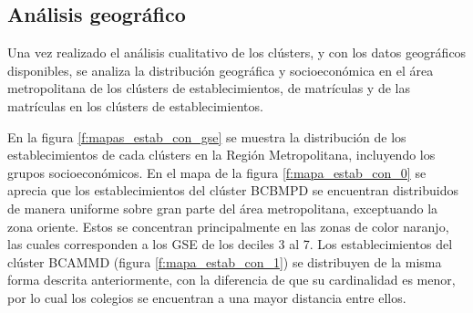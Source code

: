 \subsection{Análisis geográfico}

Una vez realizado el análisis cualitativo de los clústers, y con los datos geográficos disponibles, se analiza la distribución geográfica y socioeconómica en el área metropolitana de los clústers de establecimientos, de matrículas y de las matrículas en los clústers de establecimientos.

En la figura \ref{f:mapas_estab_con_gse} se muestra la distribución de los establecimientos de cada clústers en la Región Metropolitana, incluyendo los grupos socioeconómicos. En el mapa de la figura \ref{f:mapa_estab_con_0} se aprecia que los establecimientos del clúster BCBMPD se encuentran distribuidos de manera uniforme sobre gran parte del área metropolitana, exceptuando la zona oriente. Estos se concentran principalmente en las zonas de color naranjo, las cuales corresponden a los GSE de los deciles 3 al 7. Los establecimientos del clúster BCAMMD (figura \ref{f:mapa_estab_con_1}) se distribuyen de la misma forma descrita anteriormente, con la diferencia de que su cardinalidad es menor, por lo cual los colegios se encuentran a una mayor distancia entre ellos.

